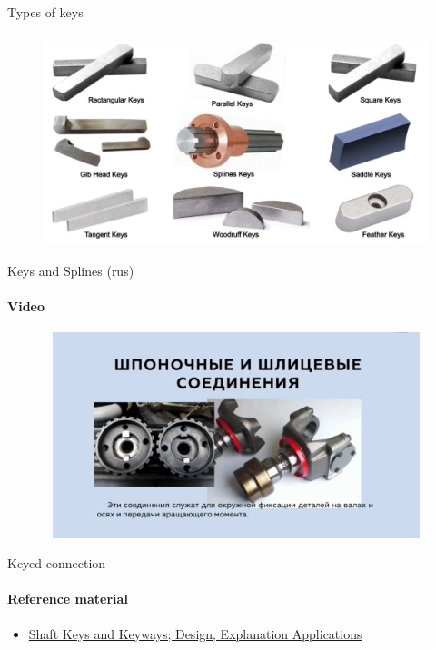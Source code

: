 \documentclass[aspectratio=169]{beamer}
\begin{document}
\begin{frame}[t]{Types of keys}
    \framesubtitle{}
    \vspace{-0.6cm}
    \begin{figure}[H]
        \centering\includegraphics[height=6cm,width=1\textwidth,keepaspectratio]{types_of_keys.jpg}
        \label{fig:types_of_keys.jpg}
    \end{figure}
\end{frame}

\begin{frame}[t]{Keys and Splines (rus)}
    \framesubtitle{Video}
    \vspace{-0.6cm}
    \begin{figure}[H]
        \href{https://youtu.be/-bktOSXtLB8}{
            \centering\includegraphics[height=6cm,width=1\textwidth,keepaspectratio]{key_rus_video.jpg}}
        \label{fig:key_rus_video.jpg}
    \end{figure}
\end{frame}

\begin{frame}[t]{Keyed connection}
    \framesubtitle{Reference material}
    \begin{itemize}
        \item \href{https://mechanicalland.com/shaft-keys/}{Shaft Keys and Keyways; Design, Explanation Applications}
    \end{itemize}
\end{frame}
\end{document}
